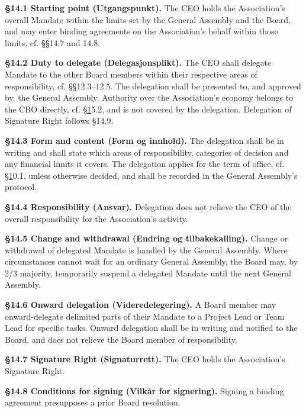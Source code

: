\documentclass{../../../Common/Latex/Templates/rapport}
\begin{document}
\label{bylaw:14}
\textbf{\S 14.1 Starting point (Utgangspunkt).}\label{bylaw:14.1} The CEO holds the Association's overall Mandate within the limits set by the General Assembly and the Board, and may enter binding agreements on the Association's behalf within those limits, cf. \S\S14.7 and 14.8.

\textbf{\S 14.2 Duty to delegate (Delegasjonsplikt).}\label{bylaw:14.2} The CEO shall delegate Mandate to the other Board members within their respective areas of responsibility, cf. \S\S12.3--12.5. The delegation shall be presented to, and approved by, the General Assembly. Authority over the Association's economy belongs to the CBO directly, cf. \hyperref[bylaw:1]{\S 1}5.2, and is not covered by the delegation. Delegation of Signature Right follows \S14.9.

\textbf{\S 14.3 Form and content (Form og innhold).}\label{bylaw:14.3} The delegation shall be in writing and shall state which areas of responsibility, categories of decision and any financial limits it covers. The delegation applies for the term of office, cf. \hyperref[bylaw:1]{\S 1}0.1, unless otherwise decided, and shall be recorded in the General Assembly's protocol.

\textbf{\S 14.4 Responsibility (Ansvar).}\label{bylaw:14.4} Delegation does not relieve the CEO of the overall responsibility for the Association's activity.

\textbf{\S 14.5 Change and withdrawal (Endring og tilbakekalling).}\label{bylaw:14.5} Change or withdrawal of delegated Mandate is handled by the General Assembly. Where circumstances cannot wait for an ordinary General Assembly, the Board may, by 2/3 majority, temporarily suspend a delegated Mandate until the next General Assembly.

\textbf{\S 14.6 Onward delegation (Videredelegering).}\label{bylaw:14.6} A Board member may onward-delegate delimited parts of their Mandate to a Project Lead or Team Lead for specific tasks. Onward delegation shall be in writing and notified to the Board, and does not relieve the Board member of responsibility.

\textbf{\S 14.7 Signature Right (Signaturrett).}\label{bylaw:14.7} The CEO holds the Association's Signature Right.

\textbf{\S 14.8 Conditions for signing (Vilkår for signering).}\label{bylaw:14.8} Signing a binding agreement presupposes a prior Board resolution.
\end{document}
